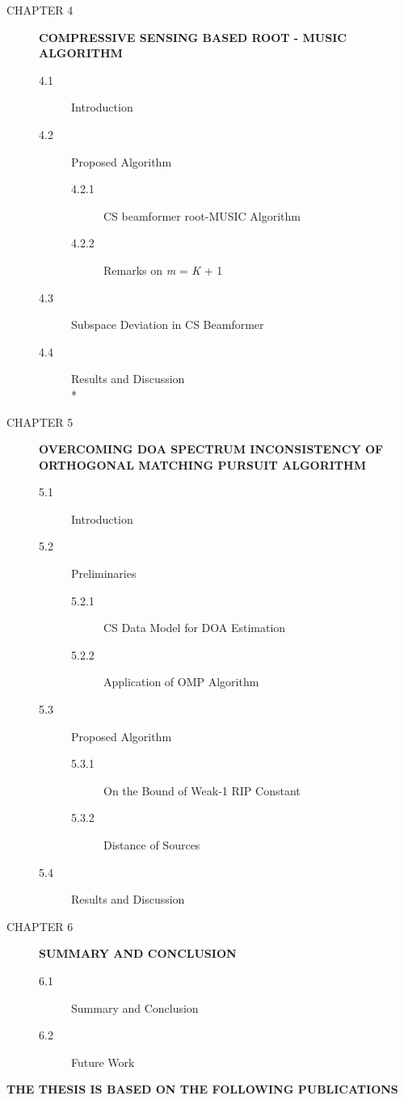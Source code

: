 \documentclass[12pt,a4paper]{article}
\theoremstyle{plain}
\theoremstyle{definition}
\begin{document}
\begin{description}
\item[CHAPTER 4]\textbf{COMPRESSIVE SENSING BASED ROOT - MUSIC ALGORITHM}%
\begin{description}%
	\item[4.1] Introduction
	\item[4.2] Proposed Algorithm %
		\begin{description}
		\item[4.2.1] CS beamformer root-MUSIC Algorithm
        \item[4.2.2] Remarks on \textit{m} = \textit{K} + 1
		\end{description}
	\item[4.3] Subspace Deviation in CS Beamformer %
    \item[4.4] Results and Discussion\\*\\
\end{description}

\item[CHAPTER 5]  \textbf{OVERCOMING DOA SPECTRUM INCONSISTENCY OF ORTHOGONAL MATCHING PURSUIT ALGORITHM}%
\begin{description}%
  \item[5.1] Introduction
  \item[5.2] Preliminaries
  		\begin{description}
		\item[5.2.1] CS Data Model for DOA Estimation
        \item[5.2.2] Application of OMP Algorithm
		\end{description}
  \item[5.3] Proposed Algorithm %
		\begin{description}
		\item[5.3.1] On the Bound of Weak-1 RIP Constant
        \item[5.3.2] Distance of Sources
		\end{description}
  \item[5.4] Results and Discussion
\end{description}

\item[CHAPTER 6] \textbf{SUMMARY AND CONCLUSION}%
\begin{description}%
	\item[6.1] Summary and Conclusion
	\item[6.2] Future Work
\end{description}

\end{description}
\newpage
\begin{center}
\textbf{THE THESIS IS BASED ON THE FOLLOWING PUBLICATIONS}
\end{center}
\bigskip
\end{document}
